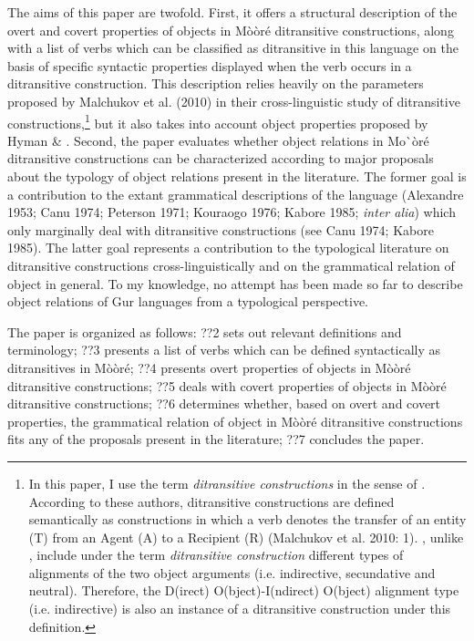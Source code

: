 \documentclass[output=paper]{langsci/langscibook}
\begin{document}
The aims of this paper are twofold. First, it offers a structural description of the overt and covert properties of objects in Mòòré ditransitive constructions, along with a list of verbs which can be classified as ditransitive in this language on the basis of specific syntactic properties displayed when the verb occurs in a ditransitive construction. This description relies heavily on the parameters proposed by Malchukov et al.\textit{ }(2010) in their cross-linguistic study of ditransitive constructions,\footnote{ In this paper, I use the term \textit{ditransitive constructions} in the sense of \citet{MalchukovEtAl2010}. According to these authors, ditransitive constructions are defined semantically as constructions in which a verb denotes the transfer of an entity (T) from an Agent (A) to a Recipient (R) (Malchukov et al. 2010: 1). \citet{MalchukovEtAl2010}, unlike \citet{Goldberg1995}, include under the term \textit{ditransitive construction} different types of alignments of the two object arguments (i.e. indirective, secundative and neutral). Therefore, the D(irect) O(bject)-I(ndirect) O(bject) alignment type (i.e. indirective) is also an instance of a ditransitive construction under this definition. } but it also takes into account object properties proposed by Hyman \& \citet{Duranti1982}.  Second, the paper evaluates whether object relations in Mo\`{ }òré ditransitive constructions can be characterized according to major proposals about the typology of object relations present in the literature. The former goal is a contribution to the extant grammatical descriptions of the language (Alexandre 1953; Canu 1974; Peterson 1971; Kouraogo 1976; Kabore 1985; \textit{inter alia}) which only marginally deal with ditransitive constructions (see Canu 1974; Kabore 1985). The latter goal represents a contribution to the typological literature on ditransitive constructions cross-linguistically and on the grammatical relation of object in general. To my knowledge, no attempt has been made so far to describe object relations of Gur languages from a typological perspective.  

The paper is organized as follows: ??2 sets out relevant definitions and terminology; ??3 presents a list of verbs which can be defined syntactically as ditransitives in Mòòré; ??4 presents overt properties of objects in Mòòré ditransitive constructions; ??5 deals with covert properties of objects in Mòòré ditransitive constructions; ??6 determines whether, based on overt and covert properties, the grammatical relation of object in Mòòré ditransitive constructions fits any of the proposals present in the literature; ??7 concludes the paper.    
\end{document}
